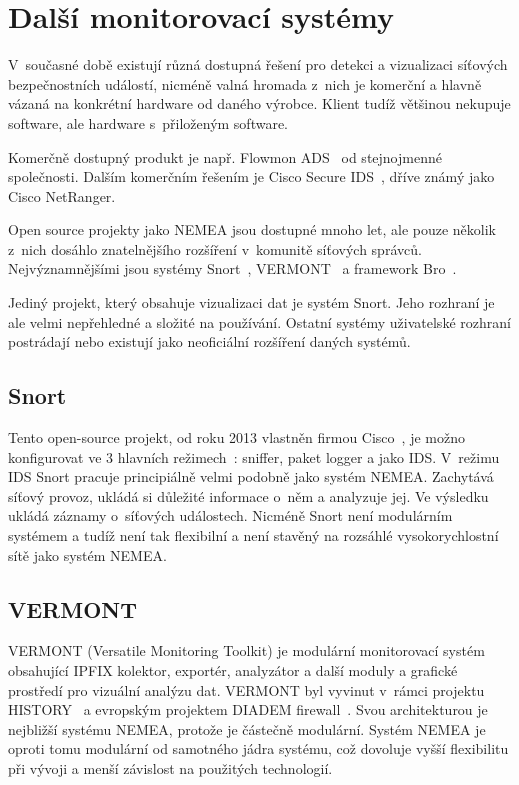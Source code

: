 \section{Další monitorovací systémy}

V~současné době existují různá dostupná řešení pro detekci a vizualizaci síťových bezpečnostních událostí, nicméně valná hromada z~nich je komerční a hlavně vázaná na konkrétní hardware od daného výrobce. Klient tudíž většinou nekupuje software, ale hardware s~přiloženým software.

Komerčně dostupný produkt je např. Flowmon ADS~\cite{flowmon:report}\cite{flowmon:ads} od stejnojmenné společnosti. Dalším komerčním řešením je Cisco Secure IDS~\cite{cisco:ids}, dříve známý jako Cisco NetRanger.

Open source projekty jako NEMEA jsou dostupné mnoho let, ale pouze několik z~nich dosáhlo znatelnějšího rozšíření v~komunitě síťových správců. Nejvýznamnějšími jsou systémy Snort~\cite{snort}, VERMONT~\cite{vermont} a framework Bro~\cite{bro}.

Jediný projekt, který obsahuje vizualizaci dat je systém Snort. Jeho rozhraní je ale velmi nepřehledné a složité na používání. Ostatní systémy uživatelské rozhraní postrádají nebo existují jako neoficiální rozšíření daných systémů.

\subsection*{Snort}
Tento open-source projekt, od roku 2013 vlastněn firmou Cisco~\cite{snort:cisco}, je možno konfigurovat ve 3 hlavních režimech~\cite{snort:modes}: sniffer, paket logger a jako IDS. V~režimu IDS Snort pracuje principiálně velmi podobně jako systém NEMEA. Zachytává síťový provoz, ukládá si důležité informace o~něm a analyzuje jej. Ve výsledku ukládá záznamy o~síťových událostech. Nicméně Snort není modulárním systémem a tudíž není tak flexibilní a není stavěný na rozsáhlé vysokorychlostní sítě jako systém NEMEA.

\subsection*{VERMONT}

VERMONT (Versatile Monitoring Toolkit) je modulární monitorovací systém obsahující IPFIX kolektor, exportér, analyzátor a další moduly a grafické prostředí pro vizuální analýzu dat. VERMONT byl vyvinut v~rámci projektu HISTORY~\cite{vermont:history} a evropským projektem DIADEM firewall~\cite{vermont:diadem}. Svou architekturou je nejbližší systému NEMEA, protože je částečně modulární. Systém NEMEA je oproti tomu modulární od samotného jádra systému, což dovoluje vyšší flexibilitu při vývoji a menší závislost na použitých technologií.

